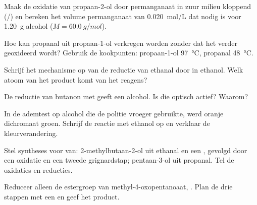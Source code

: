 \begin{exercise}[$\star\star$]\label{exo:b1:organic-redox:5}
Maak de oxidatie van propaan-2-ol door permanganaat in zuur milieu
kloppend (/) en bereken het volume permanganaat van
\qty{0.020}{mol/L} dat nodig is voor \qty{1.20}{g} alcohol ($M = \qty{60.0}{g/mol}$).
\end{exercise}

\begin{exercise}[$\star\star$]\label{exo:b1:organic-redox:6}
Hoe kan propanal uit propaan-1-ol verkregen worden zonder dat het verder
geoxideerd wordt? Gebruik de kookpunten: propaan-1-ol
\qty{97}{\celsius}, propanal \qty{48}{\celsius}.
\end{exercise}

\begin{exercise}[$\star\star$]\label{exo:b1:organic-redox:7}
Schrijf het mechanisme op van de reductie van ethanal door  in
ethanol. Welk atoom van het product komt van het reagens?
\end{exercise}

\begin{exercise}[$\star\star$]\label{exo:b1:organic-redox:8}
De reductie van butanon met  geeft een  alcohol. Is die
optisch actief? Waarom?
\end{exercise}

\begin{exercise}[$\star\star$]\label{exo:b1:organic-redox:9}
In de ademtest op alcohol die de politie vroeger gebruikte, werd oranje
dichromaat groen. Schrijf de reactie met ethanol op en verklaar de
kleurverandering.
\end{exercise}

\begin{exercise}[$\star\star\star$]\label{exo:b1:organic-redox:10}
Stel syntheses voor van: 2-methylbutaan-2-ol uit ethanal en een
, gevolgd door een oxidatie en een tweede grignardstap;
pentaan-3-ol uit propanal. Tel de oxidaties en reducties.
\end{exercise}

\begin{exercise}[$\star\star\star$]\label{exo:b1:organic-redox:11}
Reduceer alleen de estergroep van methyl-4-oxopentanoaat,
. Plan de drie stappen met een  en geef
het product.
\end{exercise}

